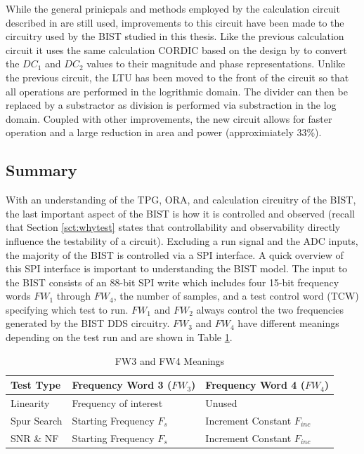 \documentclass[12pt]{report}
\begin{document}
While the general prinicpals and methods employed by the calculation circuit described in \cite{joey} are still used, improvements to this circuit have been made to the circuitry used by the BIST studied in this thesis.  Like the previous calculation circuit it uses the same calculation CORDIC based on the design by \cite{joey} to convert the $DC_1$ and $DC_2$ values to their magnitude and phase representations.  Unlike the previous circuit, the LTU has been moved to the front of the circuit so that all operations are performed in the logrithmic domain.  The divider can then be replaced by a substractor as division is performed via substraction in the log domain.  Coupled with other improvements, the new circuit allows for faster operation and a large reduction in area and power (approximiately 33\%).

\subsection{Summary}
With an understanding of the TPG, ORA, and calculation circuitry of the BIST, the last important aspect of the BIST is how it is controlled and observed (recall that Section \ref{sct:whytest} states that controllability and observability directly influence the testability of a circuit).  Excluding a run signal and the ADC inputs, the majority of the BIST is controlled via a SPI interface.  A quick overview of this SPI interface is important to understanding the BIST model.  The input to the BIST consists of an 88-bit SPI write which includes four 15-bit frequency words $FW_1$ through $FW_4$, the number of samples, and a test control word (TCW) specifying which test to run.  $FW_1$ and $FW_2$ always control the two frequencies generated by the BIST DDS circuitry.  $FW_3$ and $FW_4$ have different meanings depending on the test run and are shown in Table \ref{tbl:fw34}.  
\begin{table}
  \caption{FW3 and FW4 Meanings}
  \begin{center}
    \begin{tabular}{|l|l|l|}
      \hline
      Test Type & Frequency Word 3 ($FW_3$) & Frequency Word 4 ($FW_4$) \\ \hline
      Linearity & Frequency of interest & Unused \\ \hline
      Spur Search & Starting Frequency $F_s$ & Increment Constant $F_{inc}$ \\ \hline
      SNR \& NF & Starting Frequency $F_s$ & Increment Constant $F_{inc}$ \\ \hline
    \end{tabular}
  \end{center}
  \label{tbl:fw34}
\end{table}
\end{document}
